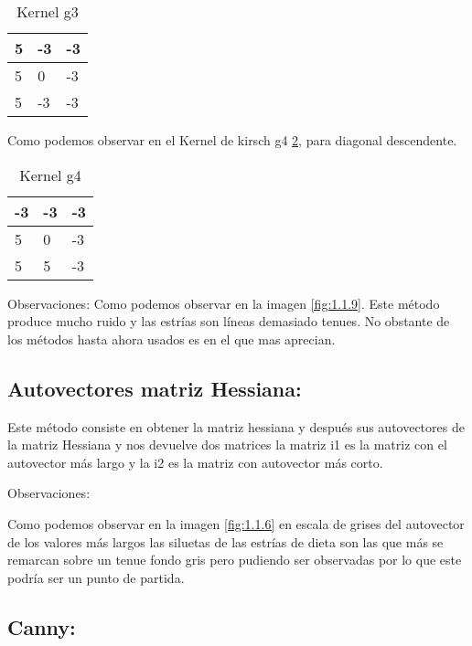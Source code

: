 \begin{table}[]
	\centering
	\caption{Kernel g3}
	\label{F_k6_3}
	\begin{tabular}{|l|l|l|}
		\hline
		5  & -3 & -3  \\ \hline
		5 & 0  & -3 \\ \hline
		5 & -3 & -3 \\ \hline
	\end{tabular}
\end{table}

Como podemos observar en el Kernel de kirsch g4 \ref{F_k6_4}, para diagonal descendente.

\begin{table}[]
	\centering
	\caption{Kernel g4}
	\label{F_k6_4}
	\begin{tabular}{|l|l|l|}
		\hline
		-3  & -3 & -3  \\ \hline
		5 & 0  & -3 \\ \hline
		5 & 5 & -3 \\ \hline
	\end{tabular}
\end{table}
Observaciones:
Como podemos observar en la imagen \ref{fig:1.1.9}.
Este método produce mucho ruido y las estrías son líneas demasiado tenues.
No obstante de los métodos hasta ahora usados es en el que mas aprecian.

\subsection{Autovectores matriz Hessiana:}
Este método consiste en obtener la matriz hessiana \cite{wiki:Hessiana} y después sus autovectores de la matriz Hessiana y nos devuelve dos matrices la matriz i1 es la matriz con el autovector más largo y la i2 es la matriz con autovector más corto.



Observaciones: 

Como podemos observar en la imagen \ref{fig:1.1.6} en escala de grises del autovector de los valores más largos las siluetas de las estrías de dieta son las que más se remarcan sobre un tenue fondo gris pero pudiendo ser observadas por lo que este podría ser un punto de partida.



\subsection{Canny:}

